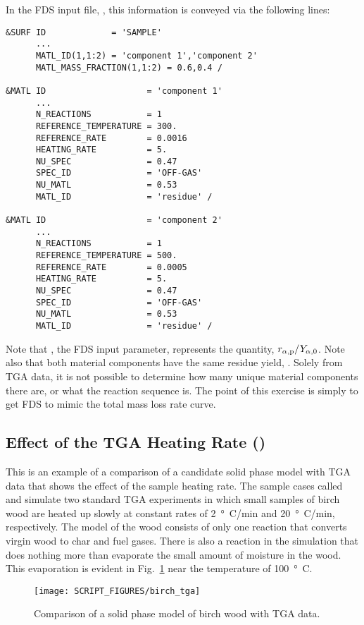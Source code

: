 \documentclass[11pt]{book}
\begin{document}
In the FDS input file, , this information is conveyed via the following lines:
\begin{lstlisting}
&SURF ID             = 'SAMPLE'
      ...
      MATL_ID(1,1:2) = 'component 1','component 2'
      MATL_MASS_FRACTION(1,1:2) = 0.6,0.4 /

&MATL ID                    = 'component 1'
      ...
      N_REACTIONS           = 1
      REFERENCE_TEMPERATURE = 300.
      REFERENCE_RATE        = 0.0016
      HEATING_RATE          = 5.
      NU_SPEC               = 0.47
      SPEC_ID               = 'OFF-GAS'
      NU_MATL               = 0.53
      MATL_ID               = 'residue' /

&MATL ID                    = 'component 2'
      ...
      N_REACTIONS           = 1
      REFERENCE_TEMPERATURE = 500.
      REFERENCE_RATE        = 0.0005
      HEATING_RATE          = 5.
      NU_SPEC               = 0.47
      SPEC_ID               = 'OFF-GAS'
      NU_MATL               = 0.53
      MATL_ID               = 'residue' /
\end{lstlisting}
Note that , the FDS input parameter, represents the quantity, $r_{\alpha,{\rm p}}/Y_{\alpha,0}$. Note also that both material components have the same residue yield, . Solely from TGA data, it is not possible to determine how many unique material components there are, or what the reaction sequence is. The point of this exercise is simply to get FDS to mimic the total mass loss rate curve.


\subsection{Effect of the TGA Heating Rate (\texorpdfstring{}{birch\_tga})}
\label{birch_tga}

This is an example of a comparison of a candidate solid phase model with TGA data that shows the effect of the sample heating rate. The sample cases called  and  simulate two standard TGA experiments in which small samples of birch wood are heated up slowly at constant rates of 2~\si{\degree C}/min and 20~\si{\degree C}/min, respectively. The model of the wood consists of only one reaction that converts virgin wood to char and fuel gases. There is also a reaction in the simulation that does nothing more than evaporate the small amount of moisture in the wood. This evaporation is evident in Fig.~\ref{fig_birch_tga} near the temperature of 100~\si{\degree C}.
\begin{figure}[!htb]
\centering
\texttt{[image: SCRIPT\_FIGURES/birch\_tga]}
\caption[An example of TGA data]{\label{fig_birch_tga} Comparison of a solid phase model of birch wood with TGA data.}
\end{figure}
\end{document}
